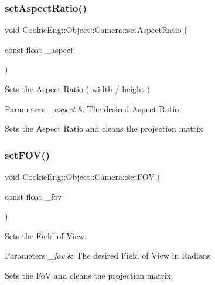 \subsubsection{\texorpdfstring{set\+Aspect\+Ratio()}{setAspectRatio()}}
{\footnotesize\ttfamily void Cookie\+Eng\+::\+Object\+::\+Camera\+::set\+Aspect\+Ratio (\begin{DoxyParamCaption}\item[{const float}]{\+\_\+aspect }\end{DoxyParamCaption})\hspace{0.3cm}{\ttfamily [inline]}}



Sets the Aspect Ratio ( width / height ) 


\begin{DoxyParams}{Parameters}
{\em \+\_\+aspect} & The desired Aspect Ratio\\
\hline
\end{DoxyParams}
Sets the Aspect Ratio and cleans the projection matrix \mbox{\label{class_cookie_eng_1_1_object_1_1_camera_aef44a3e6cef1540be7e8bcb977dddd78}} 
\subsubsection{\texorpdfstring{set\+F\+O\+V()}{setFOV()}}
{\footnotesize\ttfamily void Cookie\+Eng\+::\+Object\+::\+Camera\+::set\+F\+OV (\begin{DoxyParamCaption}\item[{const float}]{\+\_\+fov }\end{DoxyParamCaption})\hspace{0.3cm}{\ttfamily [inline]}}



Sets the Field of View. 


\begin{DoxyParams}{Parameters}
{\em \+\_\+fov} & The desired Field of View in Radians\\
\hline
\end{DoxyParams}
Sets the FoV and cleans the projection matrix \mbox{\label{class_cookie_eng_1_1_object_1_1_camera_a0b8a35f92490adf193d36f2906a2c1d8}} 
